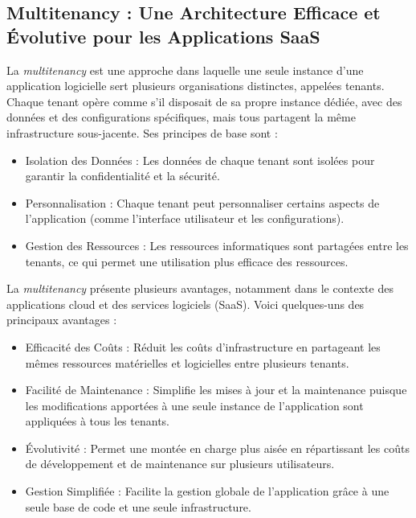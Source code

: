 \subsection{Multitenancy : Une Architecture Efficace et Évolutive pour les Applications SaaS}



\hspace{\parindent}La \textit{multitenancy} est une approche dans laquelle une seule instance d'une application logicielle sert plusieurs organisations distinctes, appelées tenants. Chaque tenant opère comme s'il disposait de sa propre instance dédiée, avec des données et des configurations spécifiques, mais tous partagent la même infrastructure sous-jacente. Ses principes de base sont :

\begin{itemize}
    \item Isolation des Données : Les données de chaque tenant sont isolées pour garantir la confidentialité et la sécurité.

    \item Personnalisation : Chaque tenant peut personnaliser certains aspects de l'application (comme l'interface utilisateur et les configurations).

    \item Gestion des Ressources : Les ressources informatiques sont partagées entre les tenants, ce qui permet une utilisation plus efficace des ressources.
    
\end{itemize}


La \textit{multitenancy} présente plusieurs avantages, notamment dans le contexte des applications cloud et des services logiciels (SaaS). Voici quelques-uns des principaux avantages :

\begin{itemize}
    \item Efficacité des Coûts : Réduit les coûts d'infrastructure en partageant les mêmes ressources matérielles et logicielles entre plusieurs tenants.

    \item Facilité de Maintenance : Simplifie les mises à jour et la maintenance puisque les modifications apportées à une seule instance de l'application sont appliquées à tous les tenants.

    \item Évolutivité : Permet une montée en charge plus aisée en répartissant les coûts de développement et de maintenance sur plusieurs utilisateurs.

    \item Gestion Simplifiée : Facilite la gestion globale de l'application grâce à une seule base de code et une seule infrastructure.

    
\end{itemize}


